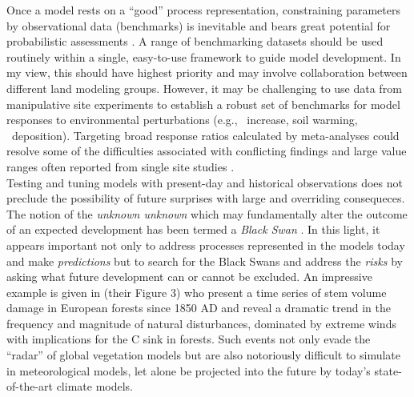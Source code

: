 Once a model rests on a ``good'' process representation, constraining parameters by observational data (benchmarks) is inevitable and
bears great potential for probabilistic assessments
\citep{steinacher13}. A range of benchmarking datasets 
\citep{luo12,dalmonech13} should be used routinely within a single, 
easy-to-use framework to guide model development. In my view, this should have
highest priority and may involve collaboration between different land
modeling groups. However, it may be challenging to use data from manipulative
site experiments to establish a robust set of benchmarks for model responses
to environmental perturbations (e.g., \coo\ increase, soil warming, \nr\
deposition). Targeting broad response ratios calculated by
meta-analyses could resolve some of the difficulties associated with
conflicting findings and large value ranges often reported from single site studies \citep{barnard05}.\\

Testing and tuning models with present-day and historical observations
does not preclude the possibility of future surprises with large and
overriding consequeces. The notion of the {\it unknown unknown} which may
fundamentally alter the outcome of an expected development has been
termed a {\it Black Swan} \citep{taleb}. In this light, it appears
important not only to address processes represented in the
models today and make {\it predictions} but to search for the Black Swans
and address the {\it risks} by asking what future development can or
cannot be excluded. An impressive example is given in
\citet{nabuurs13} (their Figure 3) who present a time series of stem volume damage in
European forests since 1850 AD and reveal a dramatic trend in the
frequency and magnitude of natural disturbances, dominated by extreme
winds with implications for the C sink in forests. Such events not
only evade the ``radar'' of global vegetation models but are also
notoriously difficult to simulate in meteorological models, let alone
be projected into the future by today's state-of-the-art climate models. 


 
